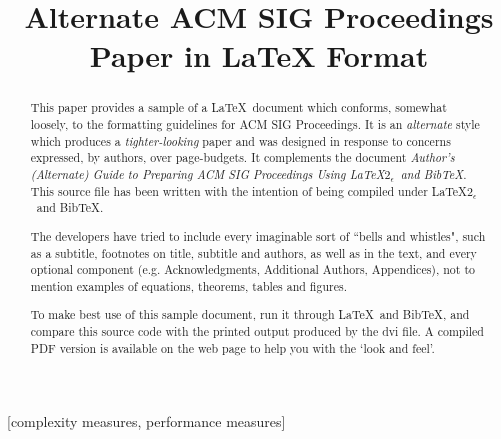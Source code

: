 \documentclass{sig-alternate-sigmod08}
\begin{document}
%

\title{Alternate {\ttlit ACM} SIG Proceedings Paper in LaTeX
Format}
%
%
\maketitle
\begin{abstract}
This paper provides a sample of a \LaTeX\ document which conforms,
somewhat loosely, to the formatting guidelines for
ACM SIG Proceedings. It is an {\em alternate} style which produces
a {\em tighter-looking} paper and was designed in response to
concerns expressed, by authors, over page-budgets.
It complements the document \textit{Author's (Alternate) Guide to
Preparing ACM SIG Proceedings Using \LaTeX$2_\epsilon$\ and Bib\TeX}.
This source file has been written with the intention of being
compiled under \LaTeX$2_\epsilon$\ and BibTeX.

The developers have tried to include every imaginable sort
of ``bells and whistles", such as a subtitle, footnotes on
title, subtitle and authors, as well as in the text, and
every optional component (e.g. Acknowledgments, Additional
Authors, Appendices), not to mention examples of
equations, theorems, tables and figures.

To make best use of this sample document, run it through \LaTeX\
and BibTeX, and compare this source code with the printed
output produced by the dvi file. A compiled PDF version
is available on the web page to help you with the
`look and feel'.
\end{abstract}

[complexity measures, performance measures]

\end{document}
